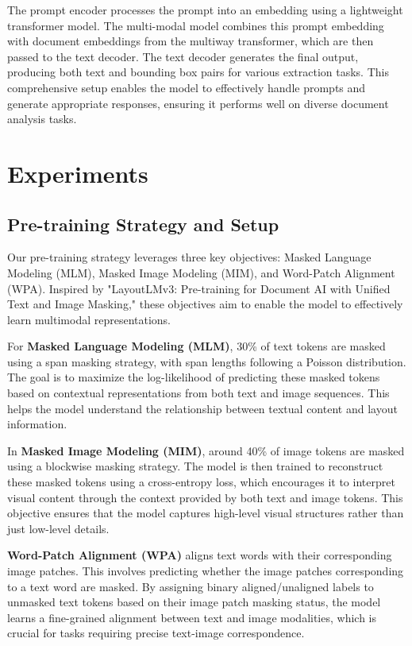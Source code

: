 \documentclass{article}
\begin{document}
The prompt encoder processes the prompt into an embedding using a lightweight transformer model. The multi-modal model combines this prompt embedding with document embeddings from the multiway transformer, which are then passed to the text decoder. The text decoder generates the final output, producing both text and bounding box pairs for various extraction tasks. This comprehensive setup enables the model to effectively handle prompts and generate appropriate responses, ensuring it performs well on diverse document analysis tasks.

\section{Experiments}

\subsection{Pre-training Strategy and Setup}

Our pre-training strategy leverages three key objectives: Masked Language Modeling (MLM), Masked Image Modeling (MIM), and Word-Patch Alignment (WPA). Inspired by "LayoutLMv3: Pre-training for Document AI with Unified Text and Image Masking," these objectives aim to enable the model to effectively learn multimodal representations.

For \textbf{Masked Language Modeling (MLM)}, 30\% of text tokens are masked using a span masking strategy, with span lengths following a Poisson distribution. The goal is to maximize the log-likelihood of predicting these masked tokens based on contextual representations from both text and image sequences. This helps the model understand the relationship between textual content and layout information.

In \textbf{Masked Image Modeling (MIM)}, around 40\% of image tokens are masked using a blockwise masking strategy. The model is then trained to reconstruct these masked tokens using a cross-entropy loss, which encourages it to interpret visual content through the context provided by both text and image tokens. This objective ensures that the model captures high-level visual structures rather than just low-level details.

\textbf{Word-Patch Alignment (WPA)} aligns text words with their corresponding image patches. This involves predicting whether the image patches corresponding to a text word are masked. By assigning binary aligned/unaligned labels to unmasked text tokens based on their image patch masking status, the model learns a fine-grained alignment between text and image modalities, which is crucial for tasks requiring precise text-image correspondence.
\end{document}
